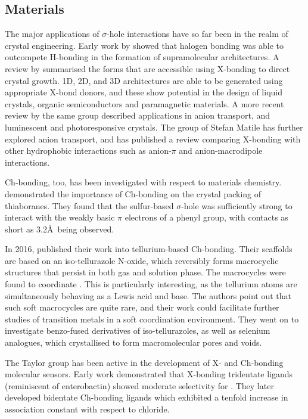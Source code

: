 \begin{refsection}
\subsection{Materials}
The major applications of $\sigma$-hole interactions have so far been in the realm of crystal engineering.
Early work by \citeauthor{Corradi2000} showed that halogen bonding was able to outcompete H-bonding in the formation of supramolecular architectures.\autocite{Corradi2000}
A review by \citeauthor{Metrangolo2008} summarised the forms that are accessible using X-bonding to direct crystal growth.\autocite{Metrangolo2008}
1D, 2D, and 3D architectures are able to be generated using appropriate X-bond donors, and these show potential in the design of liquid crystals, organic semiconductors and paramagnetic materials.
A more recent review by the same group described applications in anion transport, and luminescent and photoresponsive crystals.\autocite{Priimagi2013}
The group of Stefan Matile has further explored anion transport, and has published a review comparing X-bonding with other hydrophobic interactions such as anion-$\pi$ and anion-macrodipole interactions.\autocite{VargasJentzsch2013}

Ch-bonding, too, has been investigated with respect to materials chemistry.
\citeauthor{Fanfrlik2014} demonstrated the importance of Ch-bonding on the crystal packing of thiaboranes.\autocite{Fanfrlik2014}
They found that the sulfur-based $\sigma$-hole was sufficiently strong to interact with the weakly basic $\pi$ electrons of a phenyl group, with contacts as short as 3.2\AA~being observed.

In 2016, \citeauthor{Ho2016} published their work into tellurium-based Ch-bonding.\autocite{Ho2016}
Their scaffolds are based on an iso-tellurazole N-oxide, which reversibly forms macrocyclic structures that persist in both gas and solution phase.
The macrocycles were found to coordinate .
This is particularly interesting, as the tellurium atoms are simultaneously behaving as a Lewis acid and base.
The authors point out that such soft macrocycles are quite rare, and their work could facilitate further studies of transition metals in a soft coordination environment.
They went on to investigate benzo-fused derivatives of iso-tellurazoles, as well as selenium analogues, which crystallised to form macromolecular pores and voids.\autocite{Ho2017}

The Taylor group has been active in the development of X- and Ch-bonding molecular sensors.
Early work demonstrated that X-bonding tridentate ligands (reminiscent of enterobactin) showed moderate selectivity for .\autocite{Dimitrijevic2010}
They later developed bidentate Ch-bonding ligands which exhibited a tenfold increase in association constant with respect to chloride.\autocite{Garrett2015a,Garrett2016}


\end{refsection}
